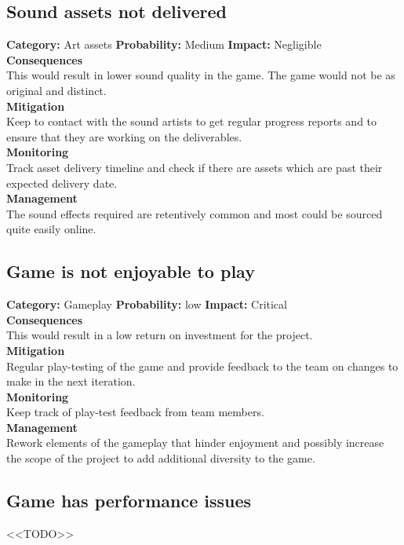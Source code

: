 \documentclass[a4paper,10pt]{article}
\begin{document}
\subsection{Sound assets not delivered}
\textbf{Category:} Art assets\newline
\textbf{Probability:} Medium\newline
\textbf{Impact:} Negligible
\\\textbf{Consequences}\\
This would result in lower sound quality in the game.
The game would not be as original and distinct.
\smallskip\\\textbf{Mitigation}\\
Keep to contact with the sound artists to get regular progress reports and to ensure that they are working on the deliverables.
\smallskip\\\textbf{Monitoring}\\
Track asset delivery timeline and check if there are assets which are past their expected delivery date.
\smallskip\\\textbf{Management}\\
The sound effects required are retentively common and most could be sourced quite easily online.

\subsection{Game is not enjoyable to play}
\textbf{Category:} Gameplay\newline
\textbf{Probability:} low\newline
\textbf{Impact:} Critical
\\\textbf{Consequences}\\
This would result in a low return on investment for the project.
\smallskip\\\textbf{Mitigation}\\
Regular play-testing of the game and provide feedback to the team on changes to make in the next iteration.
\smallskip\\\textbf{Monitoring}\\
Keep track of play-test feedback from team members.
\smallskip\\\textbf{Management}\\
Rework elements of the gameplay that hinder enjoyment and possibly increase the scope of the project to add additional diversity to the game. 

\subsection{Game has performance issues}
<<TODO>>
\end{document}
